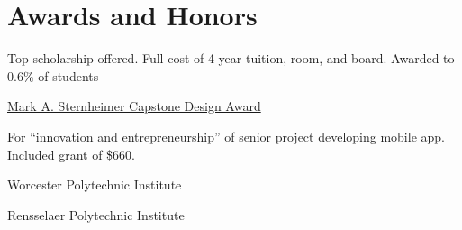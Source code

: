 \documentclass[11pt,letterpaper,serif]{moderncv}
\begin{document}
\section{Awards and Honors}
{	
	\begin{adjustwidth}{.25in}{}
		Top scholarship offered. Full cost of 4-year tuition, room, and board. \newline
		Awarded to 0.6\% of students
	\end{adjustwidth}
}

{\href{https://egr.vcu.edu/capstone/sternheimer-awards/}{Mark A. Sternheimer Capstone Design Award}}
{}{}
{
	\begin{adjustwidth}{.25in}{}
		For ``innovation and entrepreneurship'' of senior project developing mobile app. \newline
		Included grant of \$660.
	\end{adjustwidth}
}


 {}{Worcester Polytechnic Institute}{}

 {}{Rensselaer Polytechnic Institute}{}
\end{document}
